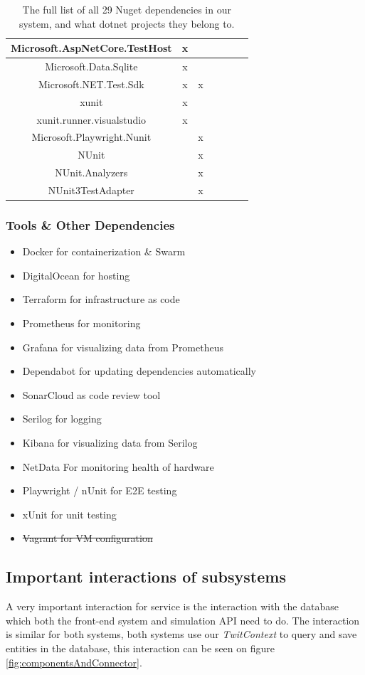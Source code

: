 \begin{table}[H]
{\begin{tabular}{|c|c|c|c|c|c|c|}
        Microsoft.AspNetCore.TestHost & x &  &  &  &  &  \\\hline
        Microsoft.Data.Sqlite & x &  &  &  &  &  \\\hline
        Microsoft.NET.Test.Sdk & x & x &  &  &  &  \\\hline
        xunit & x &  &  &  &  &  \\\hline
        xunit.runner.visualstudio & x &  &  &  &  &  \\\hline
        Microsoft.Playwright.Nunit &  & x &  &  &  &  \\\hline
        NUnit &  & x &  &  &  &  \\\hline
        NUnit.Analyzers &  & x &  &  &  &  \\\hline
        NUnit3TestAdapter &  & x &  &  &  &  \\
        \hline
    \end{tabular}
    }
    \caption{The full list of all 29 Nuget dependencies in our system, and what dotnet projects they belong to.}
    \label{tab:dependencies}
\end{table}
\subsubsection{Tools \& Other Dependencies}
\begin{itemize}
    \item Docker for containerization \& Swarm
    \item DigitalOcean for hosting
    \item Terraform for infrastructure as code
    \item Prometheus for monitoring
    \item Grafana for visualizing data from Prometheus
    \item Dependabot for updating dependencies automatically
    \item SonarCloud as code review tool
    \item Serilog for logging
    \item Kibana for visualizing data from Serilog
    \item NetData For monitoring health of hardware
    \item Playwright / nUnit for E2E testing
    \item xUnit for unit testing
    \item \st{Vagrant for VM configuration}
\end{itemize}

\subsection{Important interactions of subsystems}
A very important interaction for service is the interaction with the database which both the front-end system and simulation API need to do. The interaction is similar for both systems, both systems use our \textit{TwitContext} to query and save entities in the database, this interaction can be seen on figure \ref{fig:componentsAndConnector}.

